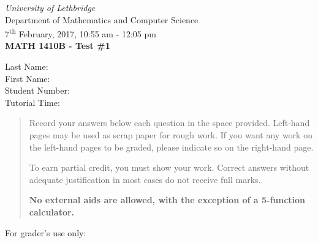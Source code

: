\documentclass[12pt]{article}
\newcommand{\skipline}{\vspace{12pt}}
\begin{document}
\author{Instructor: Sean Fitzpatrick}
\thispagestyle{plain}
\begin{center}
\emph{University of Lethbridge}\\
Department of Mathematics and Computer Science\\
7\textsuperscript{th} February, 2017, 10:55 am - 12:05 pm\\
{\bf MATH 1410B - Test \#1}\\
\end{center}
\skipline \skipline \skipline \noindent \skipline
Last Name:\underline{\hspace{353pt}}\\
\skipline
First Name:\underline{\hspace{350pt}}\\
\skipline
Student Number:\underline{\hspace{323pt}}\\
\skipline
Tutorial Time: \underline{\hspace{320pt}}\\


\vspace{0.5in}


\begin{quote}
  Record your answers below each question in the space provided.    Left-hand pages may be used as scrap paper for rough work.  If you want any work on the left-hand pages to be graded, please indicate so on the right-hand page.
 
 \bigskip
 
To earn partial credit, you must show your work. Correct answers without adequate justification in most cases do not receive full marks.

\bigskip

{\bf No external aids are allowed, with the exception of a 5-function calculator.}
\end{quote}


\vspace{0.5in}

For grader's use only:
\end{document}
